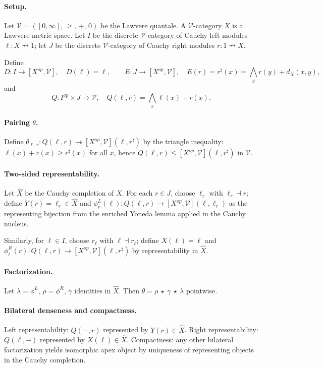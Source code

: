 \documentclass[11pt]{article}
\theoremstyle{plain}
\theoremstyle{definition}
\theoremstyle{remark}
\newcommand{\V}{\mathcal{V}}
\begin{document}
\paragraph{Setup.}
Let $\V = ([0,\infty],\,\ge,\,+,\,0)$ be the Lawvere quantale.
A $\V$-category $X$ is a Lawvere metric space. Let $I$ be the discrete $\V$-category
of Cauchy left modules $\ell:X \nrightarrow 1$; let $J$ be the discrete $\V$-category
of Cauchy right modules $r:1 \nrightarrow X$.

Define
$$
D:I \to [X^{op},\V],\quad D(\ell) = \ell,\qquad
E:J \to [X^{op},\V],\quad E(r) = r^{\sharp}(x) = \bigwedge_{y} r(y) + d_X(x,y),
$$
and
$$
Q: I^{op} \times J \to \V,\quad Q(\ell,r) = \bigwedge_{x} \ell(x) + r(x).
$$

\paragraph{Pairing $\theta$.}
Define $\theta_{\ell,r}: Q(\ell,r) \to [X^{op},\V](\ell,r^{\sharp})$ by the
triangle inequality: $\ell(x) + r(x) \ge r^{\sharp}(x)$ for all $x$, hence
$Q(\ell,r) \le [X^{op},\V](\ell,r^{\sharp})$ in $\V$.

\paragraph{Two-sided representability.}
Let $\widehat{X}$ be the Cauchy completion of $X$. For each $r\in J$, choose
$\ell_r$ with $\ell_r \dashv r$; define $Y(r) = \ell_r \in \widehat{X}$ and
$\phi^L_r(\ell): Q(\ell,r) \to [X^{op},\V](\ell,\ell_r)$ as the representing
bijection from the enriched Yoneda lemma applied in the Cauchy nucleus.

Similarly, for $\ell\in I$, choose $r_\ell$ with $\ell \dashv r_\ell$; define
$X(\ell) = \ell$ and $\phi^R_\ell(r): Q(\ell,r) \to [X^{op},\V](\ell, r^{\sharp})$
by representability in $\widehat{X}$.

\paragraph{Factorization.}
Let $\lambda=\phi^L$, $\rho=\phi^R$, $\gamma$ identities in $\widehat{X}$.
Then $\theta = \rho \ \star\ \gamma \ \star\ \lambda$ pointwise.

\paragraph{Bilateral denseness and compactness.}
Left representability: $Q(-,r)$ represented by $Y(r)\in\widehat{X}$.
Right representability: $Q(\ell,-)$ represented by $X(\ell)\in\widehat{X}$.
Compactness: any other bilateral factorization yields isomorphic apex object
by uniqueness of representing objects in the Cauchy completion.
\end{document}
